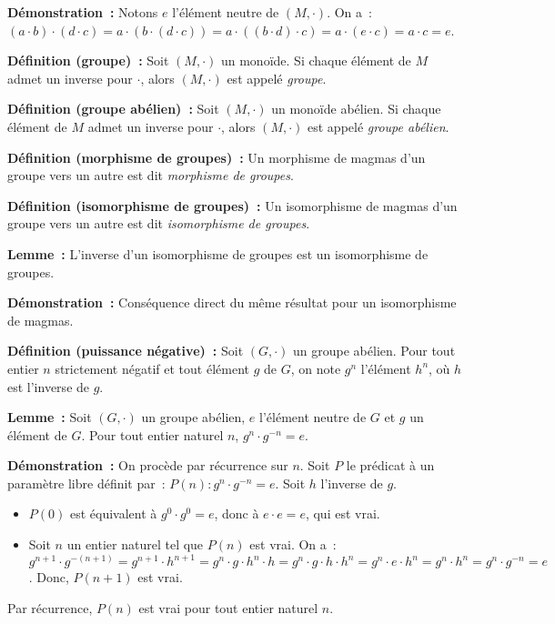 \medskip

\noindent\textbf{Démonstration :} 
    Notons $e$ l'élément neutre de $(M, \cdot)$.
    On a : $(a \cdot b) \cdot (d \cdot c) = a \cdot (b \cdot (d \cdot c)) = a \cdot ((b \cdot d) \cdot c) = a \cdot (e \cdot c) = a \cdot c = e$.

    \done

\medskip

\noindent\textbf{Définition (groupe) :} Soit $(M,\cdot)$ un monoïde. 
    Si chaque élément de $M$ admet un inverse pour $\cdot$, alors $(M,\cdot)$ est appelé \textit{groupe}.

\medskip

\noindent\textbf{Définition (groupe abélien) :} Soit $(M,\cdot)$ un monoïde abélien. 
    Si chaque élément de $M$ admet un inverse pour $\cdot$, alors $(M,\cdot)$ est appelé \textit{groupe abélien}.

\medskip

\noindent\textbf{Définition (morphisme de groupes) :} Un morphisme de magmas d'un groupe vers un autre est dit \textit{morphisme de groupes}.

\medskip

\noindent\textbf{Définition (isomorphisme de groupes) :} Un isomorphisme de magmas d'un groupe vers un autre est dit \textit{isomorphisme de groupes}.

\medskip

\noindent\textbf{Lemme :} L'inverse d'un isomorphisme de groupes est un isomorphisme de groupes.

\medskip

\noindent\textbf{Démonstration :} Conséquence direct du même résultat pour un isomorphisme de magmas.

\medskip

\noindent\textbf{Définition (puissance négative) :} Soit $(G,\cdot)$ un groupe abélien. 
    Pour tout entier $n$ strictement négatif et tout élément $g$ de $G$, on note $g^n$ l'élément $h^n$, où $h$ est l'inverse de $g$.

\medskip

\noindent\textbf{Lemme :} Soit $(G,\cdot)$ un groupe abélien, $e$ l'élément neutre de $G$ et $g$ un élément de $G$.
    Pour tout entier naturel $n$, $g^n \cdot g^{-n} = e$.

\medskip

\noindent\textbf{Démonstration :} 
    On procède par récurrence sur $n$. 
    Soit $P$ le prédicat à un paramètre libre définit par : $P(n): g^n \cdot g^{-n} = e$.
    Soit $h$ l'inverse de $g$. 
    \begin{itemize}[nosep]
        \item $P(0)$ est équivalent à $g^0 \cdot g^0 = e$, donc à $e \cdot e = e$, qui est vrai.
        \item Soit $n$ un entier naturel tel que $P(n)$ est vrai.
            On a : $g^{n+1} \cdot g^{-(n+1)} = g^{n+1} \cdot h^{n+1} = g^n \cdot g \cdot h^n \cdot h = g^n \cdot g \cdot h \cdot h^n = g^n \cdot e \cdot h^n = g^n \cdot h^n = g^n \cdot g^{-n} = e$.
            Donc, $P(n+1)$ est vrai.
    \end{itemize}
    Par récurrence, $P(n)$ est vrai pour tout entier naturel $n$.

